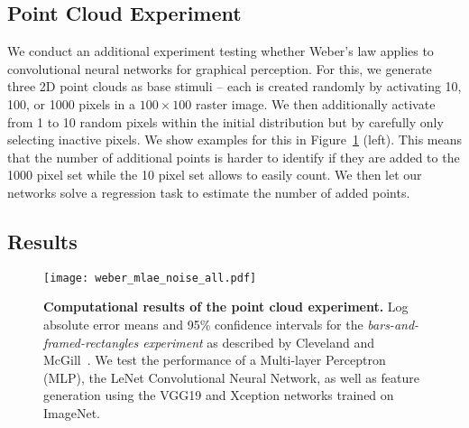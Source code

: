 \subsection{Point Cloud Experiment}

We conduct an additional experiment testing whether Weber's law applies to convolutional neural networks for graphical perception. For this, we generate three 2D point clouds as base stimuli -- each is created randomly by activating 10, 100, or 1000 pixels in a $100\times100$ raster image. We then additionally activate from 1 to 10 random pixels within the initial distribution but by carefully only selecting inactive pixels. We show examples for this in Figure~\ref{fig:weber_law} (left). This means that the number of additional points is harder to identify if they are added to the 1000 pixel set while the 10 pixel set allows to easily count. We then let our networks solve a regression task to estimate the number of added points.


\subsection{Results}



\begin{figure}[t]
	  \texttt{[image: weber\_mlae\_noise\_all.pdf]}
  \caption{\textbf{Computational results of the point cloud experiment.} Log absolute error means and 95\% confidence intervals for the \emph{bars-and-framed-rectangles experiment} as described by Cleveland and McGill~\cite{cleveland_mcgill}. We test the performance of a Multi-layer Perceptron (MLP), the LeNet Convolutional Neural Network, as well as feature generation using the VGG19 and Xception networks trained on ImageNet.}
	\label{fig:weber_law}
\end{figure}
